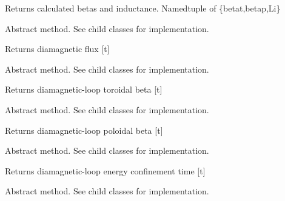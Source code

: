 \documentclass[letterpaper,10pt,english]{sphinxmanual}
\begin{document}
\begin{fulllineitems}
\begin{fulllineitems}
Returns calculated betas and inductance.
Namedtuple of \{betat,betap,Li\}

\end{fulllineitems}


\begin{fulllineitems}
\label{eqtools:eqtools.core.Equilibrium.getDiamagFlux}
Abstract method.  See child classes for implementation.

Returns diamagnetic flux {[}t{]}

\end{fulllineitems}


\begin{fulllineitems}
\label{eqtools:eqtools.core.Equilibrium.getDiamagBetaT}
Abstract method.  See child classes for implementation.

Returns diamagnetic-loop toroidal beta {[}t{]}

\end{fulllineitems}


\begin{fulllineitems}
\label{eqtools:eqtools.core.Equilibrium.getDiamagBetaP}
Abstract method.  See child classes for implementation.

Returns diamagnetic-loop poloidal beta {[}t{]}

\end{fulllineitems}


\begin{fulllineitems}
\label{eqtools:eqtools.core.Equilibrium.getDiamagTauE}
Abstract method.  See child classes for implementation.

Returns diamagnetic-loop energy confinement time {[}t{]}

\end{fulllineitems}


\begin{fulllineitems}
\label{eqtools:eqtools.core.Equilibrium.getDiamagWp}
Abstract method.  See child classes for implementation.


\end{fulllineitems}
\end{fulllineitems}
\end{document}
